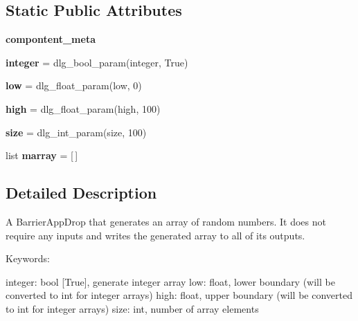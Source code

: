 \subsection*{Static Public Attributes}
\begin{DoxyCompactItemize}
\item 
{\bfseries compontent\+\_\+meta}
\item 
\mbox{\label{classdlg_1_1apps_1_1simple_1_1_random_array_app_ac6da70efab97d63ee8e8baa703cafa2f}} 
{\bfseries integer} = dlg\+\_\+bool\+\_\+param(\textquotesingle{}integer\textquotesingle{}, True)
\item 
\mbox{\label{classdlg_1_1apps_1_1simple_1_1_random_array_app_a916ffd8cca411fb7b6c922553be0f02c}} 
{\bfseries low} = dlg\+\_\+float\+\_\+param(\textquotesingle{}low\textquotesingle{}, 0)
\item 
\mbox{\label{classdlg_1_1apps_1_1simple_1_1_random_array_app_a2c859df2fda06bf576e303518bb5f92a}} 
{\bfseries high} = dlg\+\_\+float\+\_\+param(\textquotesingle{}high\textquotesingle{}, 100)
\item 
\mbox{\label{classdlg_1_1apps_1_1simple_1_1_random_array_app_af0e59d164b4e40b91fadec74ccedd9d0}} 
{\bfseries size} = dlg\+\_\+int\+\_\+param(\textquotesingle{}size\textquotesingle{}, 100)
\item 
\mbox{\label{classdlg_1_1apps_1_1simple_1_1_random_array_app_a5bb05459f2650f5ffb9226747647a421}} 
list {\bfseries marray} = \mbox{[}$\,$\mbox{]}
\end{DoxyCompactItemize}


\subsection{Detailed Description}
\begin{DoxyVerb}A BarrierAppDrop that generates an array of random numbers. It does
not require any inputs and writes the generated array to all of its
outputs.

Keywords:

integer:  bool [True], generate integer array
low:      float, lower boundary (will be converted to int for integer arrays)
high:     float, upper boundary (will be converted to int for integer arrays)
size:     int, number of array elements
\end{DoxyVerb}
 

